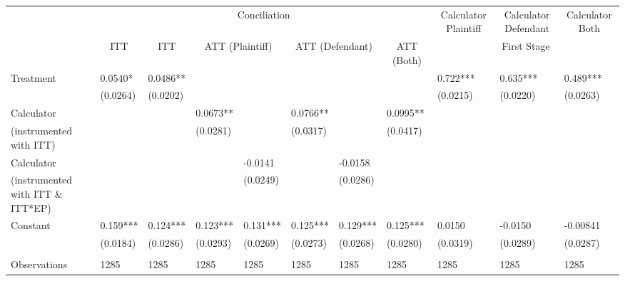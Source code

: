 \begin{tabular}{lrrlrlrlrrr}
      & \multicolumn{7}{c}{Conciliation}                      & \multicolumn{1}{c}{Calculator Plaintiff} & \multicolumn{1}{c}{Calculator Defendant} & \multicolumn{1}{c}{Calculator Both} \\
\cmidrule{2-11}      & \multicolumn{1}{c}{ITT} & \multicolumn{1}{c}{ITT} & \multicolumn{2}{c}{ATT (Plaintiff)} & \multicolumn{2}{c}{ATT  (Defendant)} & \multicolumn{1}{c}{ATT (Both)} & \multicolumn{3}{c}{First Stage} \\
\cmidrule{2-11}Treatment  & \multicolumn{1}{l}{0.0540*} & \multicolumn{1}{l}{0.0486**} &       &       &       &       &       & \multicolumn{1}{l}{0.722***} & \multicolumn{1}{l}{0.635***} & \multicolumn{1}{l}{0.489***} \\
      & \multicolumn{1}{l}{(0.0264)} & \multicolumn{1}{l}{(0.0202)} &       &       &       &       &       & \multicolumn{1}{l}{(0.0215)} & \multicolumn{1}{l}{(0.0220)} & \multicolumn{1}{l}{(0.0263)} \\
Calculator  & \multicolumn{1}{l}{} & \multicolumn{1}{l}{} & 0.0673** &       & 0.0766** &       & 0.0995** &       &       &  \\
(instrumented with ITT) & \multicolumn{1}{l}{} & \multicolumn{1}{l}{} & (0.0281) &       & (0.0317) &       & (0.0417) &       &       &  \\
Calculator  &       &       &       & \multicolumn{1}{l}{-0.0141} &       & \multicolumn{1}{l}{-0.0158} &       &       &       &  \\
(instrumented with ITT \& ITT*EP) &       &       &       & \multicolumn{1}{l}{(0.0249)} &       & \multicolumn{1}{l}{(0.0286)} &       &       &       &  \\
Constant  & \multicolumn{1}{l}{0.159***} & \multicolumn{1}{l}{0.124***} & 0.123*** & \multicolumn{1}{l}{0.131***} & 0.125*** & \multicolumn{1}{l}{0.129***} & 0.125*** & \multicolumn{1}{l}{0.0150} & \multicolumn{1}{l}{-0.0150} & \multicolumn{1}{l}{-0.00841} \\
      & \multicolumn{1}{l}{(0.0184)} & \multicolumn{1}{l}{(0.0286)} & (0.0293) & \multicolumn{1}{l}{(0.0269)} & (0.0273) & \multicolumn{1}{l}{(0.0268)} & (0.0280) & \multicolumn{1}{l}{(0.0319)} & \multicolumn{1}{l}{(0.0289)} & \multicolumn{1}{l}{(0.0287)} \\
      &       &       &       &       &       &       &       &       &       &  \\
\midrule
Observations & \multicolumn{1}{l}{1285} & \multicolumn{1}{l}{1285} & 1285  & \multicolumn{1}{l}{1285} & 1285  & \multicolumn{1}{l}{1285} & 1285  & \multicolumn{1}{l}{1285} & \multicolumn{1}{l}{1285} & \multicolumn{1}{l}{1285} \\

\end{tabular}
